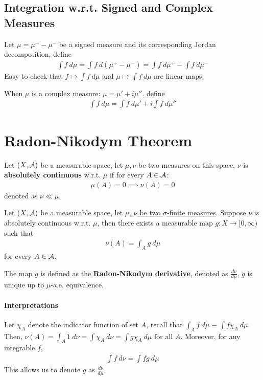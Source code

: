 \documentclass[11pt]{article}
\newcommand{\dmu}[0]{\ d\mu}
\begin{document}
	
	\subsection{Integration w.r.t. Signed and Complex Measures}
	\begin{definition}
		Let $\mu = \mu^+ - \mu^-$ be a signed measure and its corresponding Jordan decomposition, define
		\begin{align}
			\int f\dmu = \int f\ d(\mu^+ - \mu^-) = \int f\dmu^+ - \int f\dmu^-
		\end{align}
		Easy to check that $f \mapsto \int f\dmu$ and $\mu \mapsto \int f\dmu$ are linear maps.
		
		When $\mu$ is a complex measure: $\mu = \mu' + i \mu''$, define
		\begin{align}
			\int f\dmu = \int f\dmu' + i \int f\dmu''
		\end{align}
	\end{definition}

	\section{Radon-Nikodym Theorem}
	
	\begin{definition}
		Let $(X, \mathcal{{A}})$ be a measurable space, let $\mu, \nu$ be two measures on this space, $\nu$ is \textbf{absolutely continuous} w.r.t. $\mu$ if for every $A \in \mathcal{{A}}$:
		\begin{align}
			\mu(A) = 0 \implies \nu(A) = 0
		\end{align}
		denoted as $\nu \ll \mu$.
	\end{definition}

	\begin{theorem}
		Let $(X, \mathcal{{A}})$ be a measurable space, let \ul{$\mu$, $\nu$ be two $\sigma$-finite measures}. Suppose $\nu$ is absolutely continuous w.r.t. $\mu$, then there exists a measurable map $g: X \to [0, \infty)$ such that
		\begin{align}
			\nu(A) = \int_A g\dmu
		\end{align}
		for every $A \in \mathcal{{A}}$.
		
		The map $g$ is defined as the \textbf{Radon-Nikodym derivative}, denoted as $\frac{d\nu}{d\mu}$, $g$ is unique up to $\mu$-a.e. equivalence.
	\end{theorem}
	\paragraph{Interpretations} Let $\chi_A$ denote the indicator function of set $A$, recall that $\int_A f\dmu \equiv \int f\chi_A\dmu$. Then, $\nu(A) = \int_A 1\ d\nu = \int \chi_A\ d\nu = \int g \chi_A\dmu$ for all $A$. Moreover, for any integrable $f$,
	\begin{align}
		\int f\ d\nu = \int fg\dmu
	\end{align}
	This allows us to denote $g$ as $\frac{d\nu}{d\mu}$.
	
\end{document}
